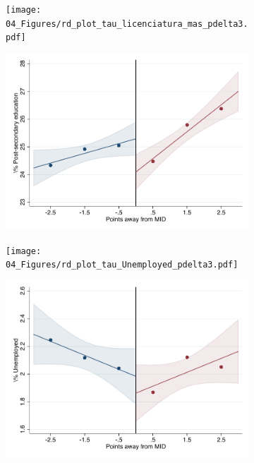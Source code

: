 \documentclass[oneside,11pt]{article}
\begin{document}
\begin{figure}[H]

    \ContinuedFloat
    \caption{(Cont.) RD plots for outcome variables across those assigned to either UNAM or IPN high-school, and those who are not\label{fig:ITT_rd_plot_elite_5}}
    \begin{center}
    
    \begin{subfigure}{0.475\textwidth}
        \centering
        \texttt{[image: 04\_Figures/rd\_plot\_tau\_licenciatura\_mas\_pdelta3.pdf]}
    \end{subfigure}
    \begin{subfigure}{0.475\textwidth}
        \centering
        \includegraphics[width=\textwidth]{04_Figures/rd_plot_mid_licenciatura_mas_pdelta3.pdf}
    \end{subfigure}

    \begin{subfigure}{0.475\textwidth}
        \centering
        \texttt{[image: 04\_Figures/rd\_plot\_tau\_Unemployed\_pdelta3.pdf]}
    \end{subfigure}
    \begin{subfigure}{0.475\textwidth}
        \centering
        \includegraphics[width=\textwidth]{04_Figures/rd_plot_mid_Unemployed_pdelta3.pdf}
    \end{subfigure}


\end{center}
\end{figure}
\end{document}
